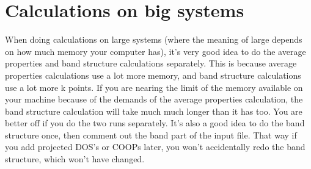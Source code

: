 \section{Calculations on big systems}

When doing calculations on large systems (where the meaning of large
depends on how much memory your computer has), it's very good idea to
do the average properties and band structure calculations separately.
This is because average properties calculations use a lot more memory,
and band structure calculations use a lot more k points.  If you are
nearing the limit of the memory available on your machine because of
the demands of the average properties calculation, the band structure
calculation will take much much longer than it has too.  You are
better off if you do the two runs separately.  It's also a good idea
to do the band structure once, then comment out the band part of the
input file.  That way if you add projected DOS's or COOPs later, you
won't accidentally redo the band structure, which won't have changed. 




